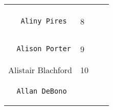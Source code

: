 \documentclass[]{article}
\begin{document}
\begin{longtable}[c]{@{}llll@{}}
\begin{minipage}[t]{0.15\columnwidth}
\end{minipage}
\\\noalign{\medskip}
\begin{minipage}[t]{0.39\columnwidth}\raggedright
\begin{verbatim}
   Aliny Pires
\end{verbatim}
\end{minipage} & \begin{minipage}[t]{0.10\columnwidth}\raggedright
8
\end{minipage} & \begin{minipage}[t]{0.13\columnwidth}\raggedright
\end{minipage} & \begin{minipage}[t]{0.15\columnwidth}\raggedright
\end{minipage}
\\\noalign{\medskip}
\begin{minipage}[t]{0.39\columnwidth}\raggedright
\begin{verbatim}
  Alison Porter
\end{verbatim}
\end{minipage} & \begin{minipage}[t]{0.10\columnwidth}\raggedright
9
\end{minipage} & \begin{minipage}[t]{0.13\columnwidth}\raggedright
\end{minipage} & \begin{minipage}[t]{0.15\columnwidth}\raggedright
\end{minipage}
\\\noalign{\medskip}
\begin{minipage}[t]{0.39\columnwidth}\raggedright
Alistair Blachford
\end{minipage} & \begin{minipage}[t]{0.10\columnwidth}\raggedright
10
\end{minipage} & \begin{minipage}[t]{0.13\columnwidth}\raggedright
\end{minipage} & \begin{minipage}[t]{0.15\columnwidth}\raggedright
\end{minipage}
\\\noalign{\medskip}
\begin{minipage}[t]{0.39\columnwidth}\raggedright
\begin{verbatim}
  Allan DeBono
\end{verbatim}
\end{minipage} & \begin{minipage}[t]{0.10\columnwidth}\raggedright

\end{minipage}
\end{longtable}
\end{document}
